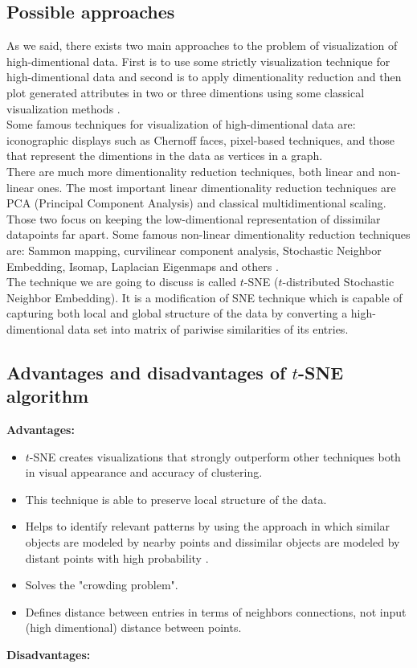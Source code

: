 \documentclass[a4paper]{article}
\begin{document}
\subsection*{Possible approaches}

As we said, there exists two main approaches to the problem of visualization of high-dimentional data. First is to use some strictly visualization technique for high-dimentional data and second is to apply dimentionality reduction and then plot generated attributes in two or three dimentions using some classical visualization methods \cite{tsnearticle}.\\

Some famous techniques for visualization of high-dimentional data are: iconographic displays such as Chernoff faces, pixel-based techniques, and those that represent the dimentions in the data as vertices in a graph. \\

There are much more dimentionality reduction techniques, both linear and non-linear ones. The most important linear dimentionality reduction techniques are PCA (Principal Component Analysis) and classical multidimentional scaling. Those two focus on keeping the low-dimentional representation of dissimilar datapoints far apart. Some famous non-linear dimentionality reduction techniques are: Sammon mapping, curvilinear component analysis, Stochastic Neighbor Embedding, Isomap, Laplacian Eigenmaps and others \cite{tsnearticle}. \\

The technique we are going to discuss is called $t$-SNE ($t$-distributed Stochastic Neighbor Embedding). It is a modification of SNE technique which is capable of capturing both local and global structure of the data by converting a high-dimentional data set into matrix of pariwise similarities of its entries. \\

\subsection*{Advantages and disadvantages of $t$-SNE algorithm}

\textbf{Advantages:}

\begin{itemize}
	\item 
	$t$-SNE creates visualizations that strongly outperform other techniques both in visual appearance and accuracy of clustering.
	\item
	This technique is able to preserve local structure of the data.
	\item 
	Helps to identify relevant patterns by using the approach in which similar objects are modeled by nearby points and dissimilar objects are modeled by distant points with high probability \cite{tsnewiki}.
	\item 
	Solves the "crowding problem".
	\item 
	Defines distance between entries in terms of neighbors connections, not input (high dimentional) distance between points.
	
\end{itemize}
\noindent
\textbf{Disadvantages:}
\end{document}
